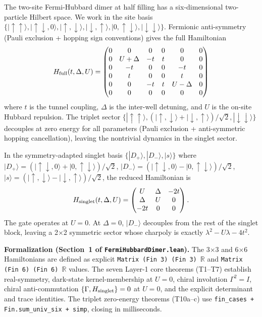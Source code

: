 \documentclass[aps,prd,twocolumn,showpacs,superscriptaddress,nofootinbib]{revtex4-2}
\newcommand{\ket}[1]{|#1\rangle}
\newcommand{\Dplus}{|D_+\rangle}
\newcommand{\Dminus}{|D_-\rangle}
\newcommand{\sstate}{|s\rangle}
\begin{document}
The two-site Fermi-Hubbard dimer at half filling has a six-dimensional
two-particle Hilbert space. We work in the site basis
$\{\ket{\uparrow\uparrow}, \ket{\uparrow\!\downarrow, 0},
\ket{\uparrow,\downarrow}, \ket{\downarrow,\uparrow},
\ket{0, \uparrow\!\downarrow}, \ket{\downarrow\downarrow}\}$. Fermionic
anti-symmetry (Pauli exclusion + hopping sign conventions) gives the
full Hamiltonian~\cite{Kiefer2026}
\begin{equation}
H_{\rm full}(t, \Delta, U) = \begin{pmatrix}
0 & 0 & 0 & 0 & 0 & 0 \\
0 & U+\Delta & -t & t & 0 & 0 \\
0 & -t & 0 & 0 & -t & 0 \\
0 & t & 0 & 0 & t & 0 \\
0 & 0 & -t & t & U-\Delta & 0 \\
0 & 0 & 0 & 0 & 0 & 0
\end{pmatrix}
\end{equation}
where $t$ is the tunnel coupling, $\Delta$ is the inter-well detuning,
and $U$ is the on-site Hubbard repulsion. The triplet sector
$\{\ket{\uparrow\uparrow}, (\ket{\uparrow,\downarrow}+\ket{\downarrow,\uparrow})/\sqrt{2},
\ket{\downarrow\downarrow}\}$ decouples at zero energy for all
parameters (Pauli exclusion + anti-symmetric hopping cancellation),
leaving the nontrivial dynamics in the singlet sector.

In the symmetry-adapted singlet basis $\{\Dplus, \Dminus, \sstate\}$
where $\Dplus = (\ket{\uparrow\!\downarrow,0}+\ket{0,\uparrow\!\downarrow})/\sqrt{2}$,
$\Dminus = (\ket{\uparrow\!\downarrow,0}-\ket{0,\uparrow\!\downarrow})/\sqrt{2}$,
$\sstate = (\ket{\uparrow,\downarrow}-\ket{\downarrow,\uparrow})/\sqrt{2}$,
the reduced Hamiltonian is
\begin{equation}
H_{\rm singlet}(t, \Delta, U) = \begin{pmatrix}
U & \Delta & -2t \\
\Delta & U & 0 \\
-2t & 0 & 0
\end{pmatrix}.
\label{eq:Hsinglet}
\end{equation}
The gate operates at $U = 0$. At $\Delta = 0$, $\Dminus$ decouples
from the rest of the singlet block, leaving a 2$\times$2 symmetric
sector whose charpoly is exactly $\lambda^2 - U\lambda - 4t^2$.

\textbf{Formalization (Section~1 of \texttt{FermiHubbardDimer.lean}).}
The 3$\times$3 and 6$\times$6 Hamiltonians are defined as explicit
\texttt{Matrix (Fin~3) (Fin~3)~$\mathbb{R}$} and
\texttt{Matrix (Fin~6) (Fin~6)~$\mathbb{R}$} values. The seven Layer-1
core theorems (T1--T7) establish real-symmetry, dark-state
kernel-membership at $U=0$, chiral involution $\Gamma^2 = I$, chiral
anti-commutation $\{\Gamma, H_{\rm singlet}\} = 0$ at $U=0$, and the
explicit determinant and trace identities. The triplet
zero-energy theorems (T10a--c) use
\texttt{fin\_cases + Fin.sum\_univ\_six + simp}, closing in
milliseconds.
\end{document}
